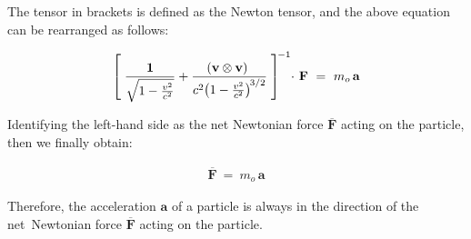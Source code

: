 \documentclass[10pt,fleqn]{article}
\begin{document}
\newpage

\noindent The tensor in brackets is defined as the Newton tensor, and the above equation can be rearranged as follows:
\par \vspace{-0.30em}
\begin{eqnarray*}
\left [ \; \frac{\mathbf{1}}{\sqrt{1 - \frac{v^2}{c^2}}} + \frac{\hspace{-0.33em}( \mathbf{v} \otimes \mathbf{v} )}{c^2\hspace{-0.18em}\left(1 - \frac{v^2}{c^2}\right)^{\hspace{-0.09em}{3/2}}} \; \right ]^{\hspace{-0.15em}-1} \hspace{-0.24em}\cdot \hspace{+0.12em}\mathbf{F} ~=~ m_o \, \mathbf{a}
\end{eqnarray*}
\par \vspace{+0.90em}
\noindent Identifying the left-hand side as the net Newtonian force $\mathbf{\overline{F}}$ acting on the particle, then we finally obtain:
\par \vspace{-0.60em}
\begin{eqnarray*}
\mathbf{\overline{F}} ~=~ m_o \, \mathbf{a}
\end{eqnarray*}
\par \vspace{+0.60em}
\noindent Therefore, the acceleration $\mathbf{a}$ of a particle is always in the direction of the \hbox {net Newtonian} force $\mathbf{\overline{F}}$ acting on the particle.

\vspace{-0.60em}

\par {}

\bigskip \smallskip
\end{document}
